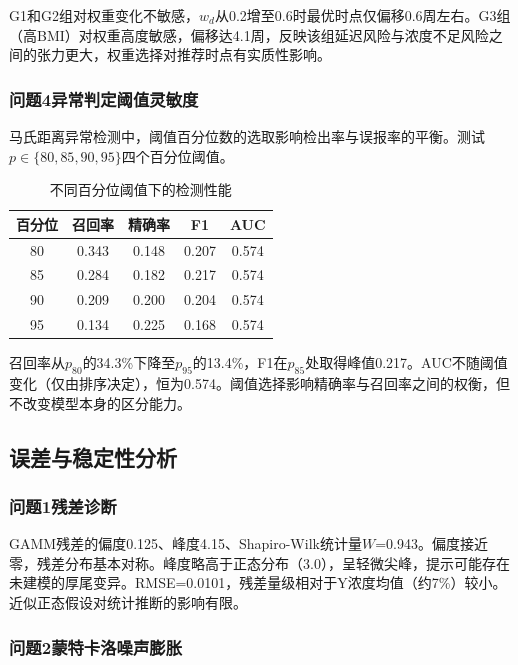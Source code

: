 G1和G2组对权重变化不敏感，$w_d$从0.2增至0.6时最优时点仅偏移0.6周左右。G3组（高BMI）对权重高度敏感，偏移达4.1周，反映该组延迟风险与浓度不足风险之间的张力更大，权重选择对推荐时点有实质性影响。

\subsubsection{问题4异常判定阈值灵敏度}

马氏距离异常检测中，阈值百分位数的选取影响检出率与误报率的平衡。测试$p \in \{80, 85, 90, 95\}$四个百分位阈值。

\begin{table}[H]
\centering
\caption{不同百分位阈值下的检测性能}\label{tab:threshold_sensitivity}
\begin{tabular}{ccccc}
\toprule
百分位 & 召回率 & 精确率 & F1 & AUC \\
\midrule
80 & 0.343 & 0.148 & 0.207 & 0.574 \\
85 & 0.284 & 0.182 & 0.217 & 0.574 \\
90 & 0.209 & 0.200 & 0.204 & 0.574 \\
95 & 0.134 & 0.225 & 0.168 & 0.574 \\
\bottomrule
\end{tabular}
\end{table}

召回率从$p_{80}$的34.3\%下降至$p_{95}$的13.4\%，F1在$p_{85}$处取得峰值0.217。AUC不随阈值变化（仅由排序决定），恒为0.574。阈值选择影响精确率与召回率之间的权衡，但不改变模型本身的区分能力。

\subsection{误差与稳定性分析}

\subsubsection{问题1残差诊断}

GAMM残差的偏度0.125、峰度4.15、Shapiro-Wilk统计量$W$=0.943。偏度接近零，残差分布基本对称。峰度略高于正态分布（3.0），呈轻微尖峰，提示可能存在未建模的厚尾变异。RMSE=0.0101，残差量级相对于Y浓度均值（约7\%）较小。近似正态假设对统计推断的影响有限。

\subsubsection{问题2蒙特卡洛噪声膨胀}

